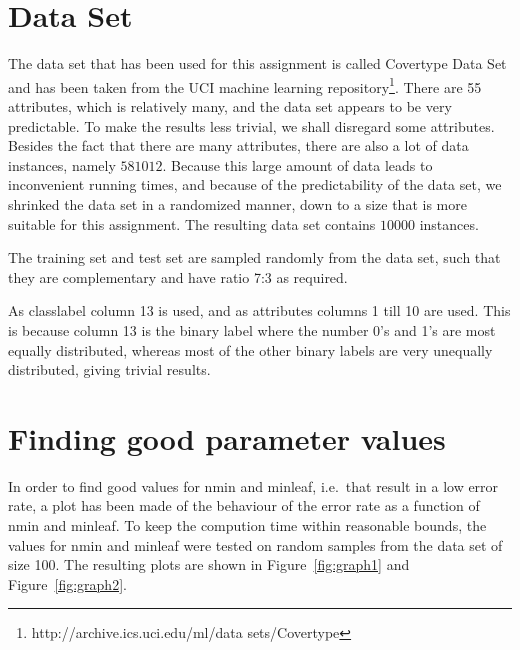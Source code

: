 \documentclass[12pt]{article}
\theoremstyle{definition}
\begin{document}
\maketitle

\section{Data Set}
\label{sec:dataset}

The data set that has been used for this assignment is called Covertype Data Set and has been
taken from the UCI machine learning
repository\footnote{http://archive.ics.uci.edu/ml/data sets/Covertype}.
There are 55 attributes, which is relatively many, and the data set appears to be very predictable.
To make the results less trivial, we shall disregard some attributes.
Besides the fact that there are many attributes, there are also a lot of data instances,
namely $581012$.
Because this large amount of data leads to inconvenient running times, and because of the
predictability of the data set, we shrinked the data set in a randomized manner,
down to a size that is more suitable for this assignment.
The resulting data set contains $10000$ instances.

The training set and test set are sampled randomly from the data set, such that
they are complementary and have ratio 7:3 as required.

As classlabel column 13 is used, and as attributes columns 1 till 10 are used.
This is because column 13 is the binary label where the number 0's and 1's are most
equally distributed, whereas most of the other binary labels are very unequally distributed,
giving trivial results.

\section{Finding good parameter values}
\label{sec:finding}

In order to find good values for nmin and minleaf, i.e.\ that result in a low error rate,
a plot has been made of the behaviour of the error rate as a function of nmin and minleaf.
To keep the compution time within reasonable bounds, the values for nmin and minleaf were
tested on random samples from the data set of size 100.
The resulting plots are shown in Figure~\ref{fig:graph1} and Figure~\ref{fig:graph2}.
\end{document}
